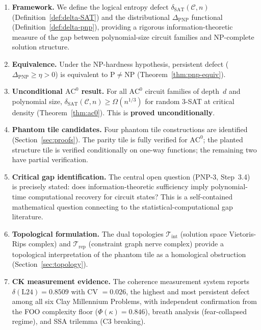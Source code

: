 \documentclass[11pt]{article}
\theoremstyle{definition}
\theoremstyle{remark}
\newcommand{\calC}{\mathcal{C}}
\newcommand{\ACz}{\mathrm{AC}^0}
\newcommand{\dSAT}{\delta_{\mathrm{SAT}}}
\begin{document}
\begin{enumerate}[label=(\arabic*),nosep]
  \item \textbf{Framework.}  We define the logical entropy defect
    $\dSAT(\calC, n)$ (Definition~\ref{def:delta-SAT}) and the
    distributional $\Delta_{\mathrm{PNP}}$ functional
    (Definition~\ref{def:delta-pnp}), providing a rigorous
    information-theoretic measure of the gap between polynomial-size
    circuit families and NP-complete solution structure.

  \item \textbf{Equivalence.}  Under the NP-hardness hypothesis, persistent
    defect ($\Delta_{\mathrm{PNP}} \geq \eta > 0$) is equivalent to
    $\mathrm{P} \neq \mathrm{NP}$ (Theorem~\ref{thm:pnp-equiv}).

  \item \textbf{Unconditional $\ACz$ result.}  For all $\ACz$ circuit
    families of depth~$d$ and polynomial size, $\dSAT(\calC, n) \geq
    \Omega(n^{1/3})$ for random 3-SAT at critical density
    (Theorem~\ref{thm:ac0}).  This is \textbf{proved unconditionally}.

  \item \textbf{Phantom tile candidates.}  Four phantom tile constructions
    are identified (Section~\ref{sec:proofs}).  The parity tile is fully
    verified for $\ACz$; the planted structure tile is verified
    conditionally on one-way functions; the remaining two have partial
    verification.

  \item \textbf{Critical gap identification.}  The central open question
    (PNP-3, Step~3.4) is precisely stated: does information-theoretic
    sufficiency imply polynomial-time computational recovery for circuit
    states?  This is a self-contained mathematical question connecting
    to the statistical-computational gap literature.

  \item \textbf{Topological formulation.}  The dual topologies
    $\mathcal{T}_{\mathrm{int}}$ (solution space Vietoris-Rips complex)
    and $\mathcal{T}_{\mathrm{rep}}$ (constraint graph nerve complex)
    provide a topological interpretation of the phantom tile as a
    homological obstruction (Section~\ref{sec:topology}).

  \item \textbf{CK measurement evidence.}  The coherence measurement
    system reports $\delta(\text{L24}) = 0.8509$ with CV $= 0.026$,
    the highest and most persistent defect among all six Clay Millennium
    Problems, with independent confirmation from the FOO complexity floor
    ($\Phi(\kappa) = 0.846$), breath analysis (fear-collapsed regime),
    and SSA trilemma (C3 breaking).
\end{enumerate}
\end{document}
